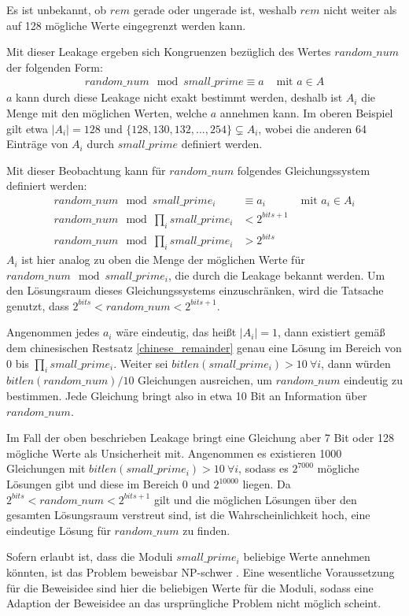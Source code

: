 Es ist unbekannt, ob $rem$ gerade oder ungerade ist, weshalb $rem$ nicht weiter als auf 128 mögliche Werte eingegrenzt werden kann.

Mit dieser Leakage ergeben sich Kongruenzen bezüglich des Wertes $random\_num$ der folgenden Form:
\begin{align}
    random\_num \mod small\_prime \equiv a &\text{ mit } a \in A
\end{align}
$a$ kann durch diese Leakage nicht exakt bestimmt werden, deshalb ist $A_i$ die Menge mit den möglichen Werten, welche $a$ annehmen kann.
Im oberen Beispiel gilt etwa $|A_i| = 128$ und $\{128,130,132,...,254\} \subsetneq A_i$, wobei die anderen 64 Einträge von $A_i$ durch $small\_prime$ definiert werden.

Mit dieser Beobachtung kann für $random\_num$ folgendes Gleichungssystem definiert werden:
\begin{align*}
    random\_num \mod small\_prime_i &\equiv a_i &\text{ mit } a_i \in A_i\\
    random\_num \mod \prod_i small\_prime_i &< 2^{bits+1} \\
    random\_num \mod \prod_i small\_prime_i &> 2^{bits}
\end{align*}
$A_i$ ist hier analog zu oben die Menge der möglichen Werte für $random\_num \mod small\_prime_i$, die durch die Leakage bekannt werden.
Um den Lösungsraum dieses Gleichungssystems einzuschränken, wird die Tatsache genutzt, dass $2^{bits} < random\_num < 2^{bits+1}$.

Angenommen jedes $a_i$ wäre eindeutig, das heißt $|A_i|=1$, dann existiert gemäß dem chinesischen Restsatz \ref{chinese_remainder} genau eine Lösung im Bereich von $0$ bis $\prod_i small\_prime_i$.
Weiter sei $bitlen(small\_prime_i) > 10 \: \forall i$, dann würden $bitlen(random\_num)/10$ Gleichungen ausreichen, um $random\_num$ eindeutig zu bestimmen.
Jede Gleichung bringt also in etwa 10 Bit an Information über $random\_num$.

Im Fall der oben beschrieben Leakage bringt eine Gleichung aber 7 Bit oder 128 mögliche Werte als Unsicherheit mit.
Angenommen es existieren 1000 Gleichungen mit $bitlen(small\_prime_i) > 10 \: \forall i$, sodass es $2^{7000}$ mögliche Lösungen gibt und diese im Bereich 0 und $2^{10000}$ liegen.
Da $2^{bits} < random\_num < 2^{bits+1}$ gilt und die möglichen Lösungen über den gesamten Lösungsraum verstreut sind, ist die Wahrscheinlichkeit hoch, eine eindeutige Lösung für $random\_num$ zu finden.

Sofern erlaubt ist, dass die Moduli $small\_prime_i$ beliebige Werte annehmen könnten, ist das Problem beweisbar NP-schwer \cite{FuzzyCRTProof}.
Eine wesentliche Voraussetzung für die Beweisidee sind hier die beliebigen Werte für die Moduli, sodass eine Adaption der Beweisidee an das ursprüngliche Problem nicht möglich scheint.

